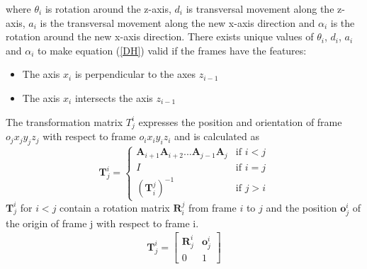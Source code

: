 where $\theta_i$ is rotation around the z-axis, $d_i$ is transversal movement along the z-axis, $a_i$ is the transversal movement along the new x-axis direction and $\alpha_i$ is the rotation around the new x-axis direction. There exists unique values of $\theta_i$, $d_i$, $a_i$ and $\alpha_i$ to make equation (\ref{DH}) valid if the frames have the features:
\begin{itemize}
\item The axis $x_i$ is perpendicular to the axes $z_{i-1}$
\item The axis $x_i$ intersects the axis $z_{i-1}$
\end{itemize}
The transformation matrix $T_j^i$ expresses the position and orientation of frame $o_jx_jy_jz_j$ with respect to frame $o_ix_iy_iz_i$ and is calculated as
\begin{equation}
  \boldsymbol{T}_j^i=\begin{cases}
    \boldsymbol{A}_{i+1}\boldsymbol{A}_{i+2}...\boldsymbol{A}_{j-1}\boldsymbol{A}_j & \text{if $i<j$}\\
    I & \text{if $i=j$}\\
    (\boldsymbol{T}_i^j)^{-1} & \text{if $j>i$}
  \end{cases}
\end{equation}
$\boldsymbol{T}_j^i$ for $i<j$ contain a rotation matrix $\boldsymbol{R}_i^j$ from frame $i$ to $j$ and the position $\boldsymbol{o}_j^i$ of the origin of frame j with respect to frame i.
\begin{eqnarray}
\boldsymbol{T}_j^i = \begin{bmatrix}
\boldsymbol{R}_j^i & \boldsymbol{o}_j^i\\
0 & 1
\end{bmatrix}
\label{T}
\end{eqnarray}
